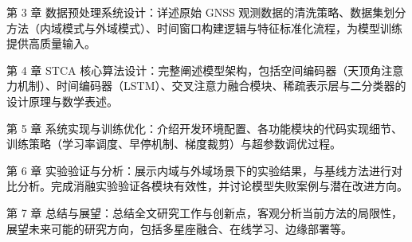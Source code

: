 第 3 章 数据预处理系统设计：详述原始 GNSS 观测数据的清洗策略、数据集划分方法（内域模式与外域模式）、时间窗口构建逻辑与特征标准化流程，为模型训练提供高质量输入。

第 4 章 STCA 核心算法设计：完整阐述模型架构，包括空间编码器（天顶角注意力机制）、时间编码器（LSTM）、交叉注意力融合模块、稀疏表示层与二分类器的设计原理与数学表述。

第 5 章 系统实现与训练优化：介绍开发环境配置、各功能模块的代码实现细节、训练策略（学习率调度、早停机制、梯度裁剪）与超参数调优过程。

第 6 章 实验验证与分析：展示内域与外域场景下的实验结果，与基线方法进行对比分析。完成消融实验验证各模块有效性，并讨论模型失败案例与潜在改进方向。

第 7 章 总结与展望：总结全文研究工作与创新点，客观分析当前方法的局限性，展望未来可能的研究方向，包括多星座融合、在线学习、边缘部署等。
